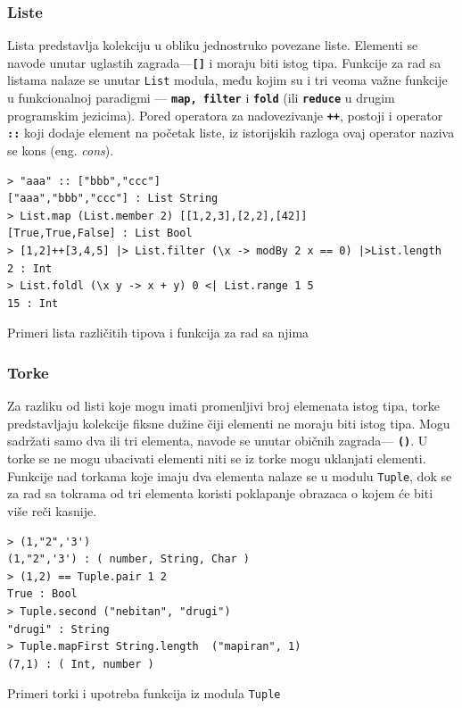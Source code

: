 \documentclass[12pt,oneside]{memoir}
\begin{document}
\subsubsection{Liste}
Lista predstavlja kolekciju u obliku jednostruko povezane liste. Elementi se navode
unutar uglastih zagrada---\textbf{\texttt{[\smallskip ]}} i moraju biti istog tipa. Funkcije za rad
sa listama nalaze se unutar \texttt{List} modula, među kojim su i tri veoma važne funkcije 
u funkcionalnoj paradigmi --- \textbf{\texttt{map, filter}} i \textbf{\texttt{fold}} (ili
\textbf{\texttt{reduce}} u drugim programskim jezicima).
Pored operatora za nadovezivanje \textbf{\texttt{++}}, postoji i operator \textbf{\texttt{::}} koji
dodaje element na početak liste, iz istorijskih razloga ovaj operator naziva se kons
(eng. \emph{cons}). 
\begin{listing}[h]
\begin{verbatim}
> "aaa" :: ["bbb","ccc"]
["aaa","bbb","ccc"] : List String
> List.map (List.member 2) [[1,2,3],[2,2],[42]]
[True,True,False] : List Bool
> [1,2]++[3,4,5] |> List.filter (\x -> modBy 2 x == 0) |>List.length
2 : Int
> List.foldl (\x y -> x + y) 0 <| List.range 1 5 
15 : Int
\end{verbatim}
\caption{Primeri lista različitih tipova i funkcija za rad sa njima}
\label{listing:liste}
\end{listing}
\subsubsection{Torke}
Za razliku od listi koje mogu imati promenljivi broj elemenata istog tipa, torke
predstavljaju kolekcije fiksne dužine čiji elementi ne moraju biti istog tipa.
Mogu sadržati samo dva ili tri elementa, navode se unutar običnih zagrada---
\textbf{\texttt{()}}. U torke se ne mogu ubacivati elementi niti se iz torke mogu
uklanjati elementi. Funkcije nad torkama koje imaju dva elementa nalaze se u modulu
\texttt{Tuple}, dok se za rad sa tokrama od tri elementa koristi poklapanje obrazaca
o kojem će biti više reči kasnije.
\begin{listing}[h]
\begin{verbatim}
> (1,"2",'3')
(1,"2",'3') : ( number, String, Char )
> (1,2) == Tuple.pair 1 2
True : Bool
> Tuple.second ("nebitan", "drugi")
"drugi" : String
> Tuple.mapFirst String.length  ("mapiran", 1)
(7,1) : ( Int, number )
\end{verbatim}
\caption{Primeri torki i upotreba funkcija iz modula \texttt{Tuple}}
\label{listing:torke}
\end{listing}
\end{document}

